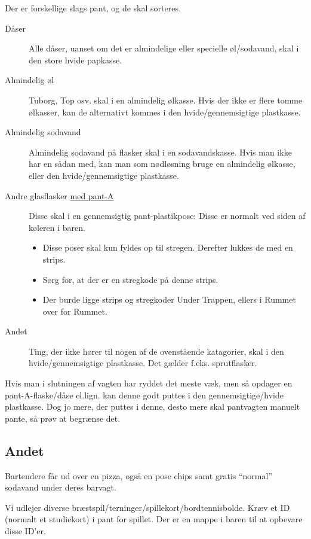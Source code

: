 Der er forskellige slags pant, og de skal sorteres.
\begin{description}
\item[Dåser] Alle dåser, uanset om det er almindelige eller specielle
  øl/sodavand, skal i den store hvide papkasse.
\item[Almindelig øl] Tuborg, Top osv. skal i en almindelig ølkasse. Hvis der ikke er flere tomme ølkasser, kan de alternativt kommes i den hvide/gennemsigtige plastkasse.
\item[Almindelig sodavand] Almindelig sodavand på flasker skal i en
  sodavandskasse. Hvis man ikke har en sådan med, kan man som
  nødløsning bruge en almindelig ølkasse, eller den hvide/gennemsigtige plastkasse.
\item[Andre glasflasker \underline{med pant-A}] Disse skal i en gennemsigtig
  pant-plastikpose: Disse er normalt ved siden af køleren i baren.
  \begin{itemize}
  \item Disse poser skal kun fyldes op til stregen. Derefter lukkes de
    med en strips.
  \item  Sørg for, at der er en stregkode på denne
    strips.
  \item Der burde ligge strips og stregkoder Under Trappen, ellers i Rummet over
    for Rummet.
  \end{itemize}
\item[Andet] Ting, der ikke hører til nogen af de ovenstående
  katagorier, skal i den hvide/gennemsigtige plastkasse. Det gælder
  f.eks. sprutflasker.
\end{description}

Hvis man i slutningen af vagten har ryddet det meste væk, men så
opdager en pant-A-flaske/dåse el.lign. kan denne godt puttes i den
gennemsigtige/hvide plastkasse. Dog jo mere, der puttes i denne, desto
mere skal pantvagten manuelt pante, så prøv at begrænse det.

\subsection{Andet}
\label{sec:intra:andet}

Bartendere får ud over en pizza, også en pose chips samt gratis
``normal'' sodavand under deres barvagt.

Vi udlejer diverse
bræstspil/terninger/spillekort/bordtennisbolde. Kræv et ID (normalt et
studiekort) i pant for spillet. Der er en mappe i baren til at
opbevare disse ID'er.

